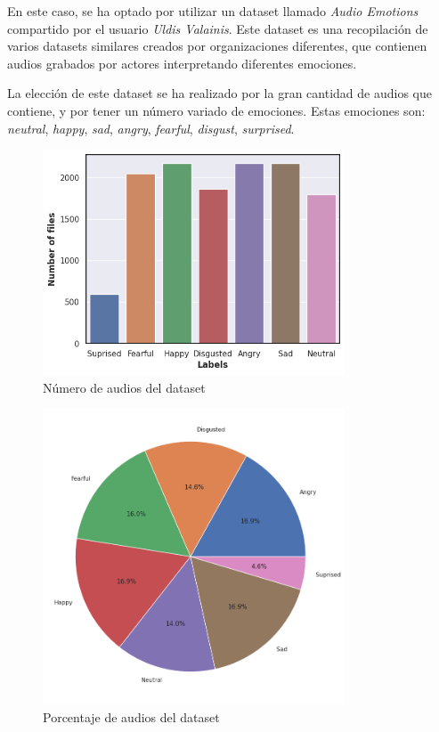 En este caso, se ha optado por utilizar un dataset llamado \textit{Audio Emotions} compartido por el usuario \textit{Uldis Valainis}. \cite{Kaggle-dataset}
Este dataset es una recopilación de varios datasets similares creados por organizaciones diferentes, que contienen audios grabados por actores interpretando diferentes emociones.

La elección de este dataset se ha realizado por la gran cantidad de audios que contiene, y por tener un número variado de emociones.
Estas emociones son: \textit{neutral}, \textit{happy}, \textit{sad}, \textit{angry}, \textit{fearful}, \textit{disgust}, \textit{surprised}.


\begin{figure}[htpb]
    \centering
    \includegraphics[width=0.8\textwidth]{cap2/images/dataset-bars.png}
    \caption{Número de audios del dataset}
    \label{fig:data-bars}
\end{figure}

\begin{figure}[htpb]
    \centering
    \includegraphics[width=0.8\textwidth]{cap2/images/dataset-pie.png}
    \caption{Porcentaje de audios del dataset}
    \label{fig:data-pie}
\end{figure}


